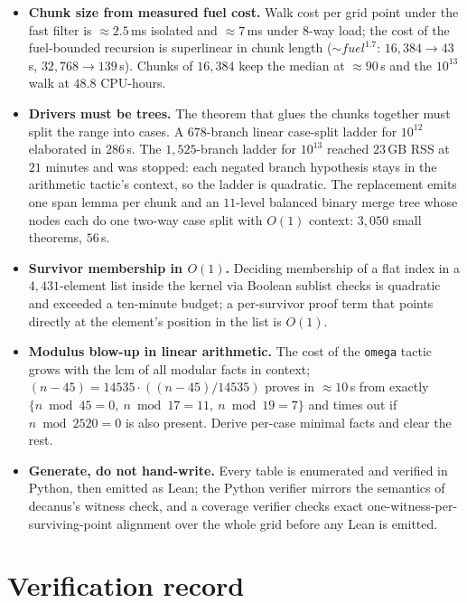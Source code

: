 \documentclass[11pt]{article}
\begin{document}
\begin{itemize}
\item \textbf{Chunk size from measured fuel cost.} Walk cost per grid point under the fast filter is $\approx2.5$\,ms isolated and $\approx7$\,ms under 8-way load; the cost of the fuel-bounded recursion is superlinear in chunk length ($\sim\textit{fuel}^{1.7}$: $16{,}384\to43$\,s, $32{,}768\to139$\,s). Chunks of $16{,}384$ keep the median at $\approx90$\,s and the $10^{13}$ walk at $48.8$ CPU-hours.
\item \textbf{Drivers must be trees.} The theorem that glues the chunks together must split the range into cases. A $678$-branch linear case-split ladder for $10^{12}$ elaborated in $286$\,s. The $1{,}525$-branch ladder for $10^{13}$ reached $23$\,GB RSS at $21$ minutes and was stopped: each negated branch hypothesis stays in the arithmetic tactic's context, so the ladder is quadratic. The replacement emits one span lemma per chunk and an $11$-level balanced binary merge tree whose nodes each do one two-way case split with $O(1)$ context: $3{,}050$ small theorems, $56$\,s.
\item \textbf{Survivor membership in $O(1)$.} Deciding membership of a flat index in a $4{,}431$-element list inside the kernel via Boolean sublist checks is quadratic and exceeded a ten-minute budget; a per-survivor proof term that points directly at the element's position in the list is $O(1)$.
\item \textbf{Modulus blow-up in linear arithmetic.} The cost of the \texttt{omega} tactic grows with the lcm of all modular facts in context; $(n-45)=14535\cdot((n-45)/14535)$ proves in $\approx10$\,s from exactly $\{n\bmod45=0,\ n\bmod17=11,\ n\bmod19=7\}$ and times out if $n\bmod2520=0$ is also present. Derive per-case minimal facts and clear the rest.
\item \textbf{Generate, do not hand-write.} Every table is enumerated and verified in Python, then emitted as Lean; the Python verifier mirrors the semantics of decanus's witness check, and a coverage verifier checks exact one-witness-per-surviving-point alignment over the whole grid before any Lean is emitted.
\end{itemize}

\section{Verification record}
\end{document}
